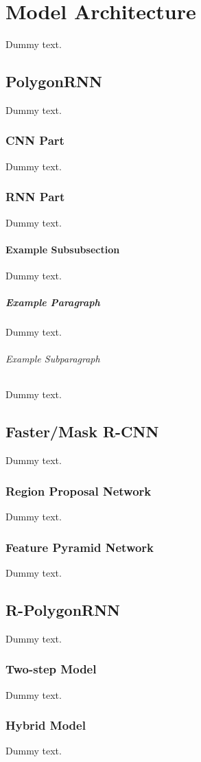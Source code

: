 \chapter{Model Architecture}

Dummy text.

\section{PolygonRNN}

Dummy text.

\subsection{CNN Part}

Dummy text.

\subsection{RNN Part}

Dummy text.

\subsubsection{Example Subsubsection}

Dummy text.

\paragraph{Example Paragraph}

Dummy text.

\subparagraph{Example Subparagraph}

Dummy text.

\section{Faster/Mask R-CNN}

Dummy text.

\subsection{Region Proposal Network}

Dummy text.

\subsection{Feature Pyramid Network}

Dummy text.

\section{R-PolygonRNN}

Dummy text.

\subsection{Two-step Model}

Dummy text.

\subsection{Hybrid Model}

Dummy text.
